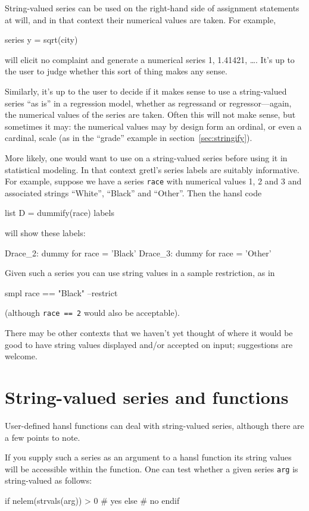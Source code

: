 String-valued series can be used on the right-hand side of assignment
statements at will, and in that context their numerical values are
taken. For example,
%
\begin{code}
series y = sqrt(city)
\end{code}
%
will elicit no complaint and generate a numerical series 1, 1.41421,
\dots{}. It's up to the user to judge whether this sort of thing
makes any sense.

Similarly, it's up to the user to decide if it makes sense to use a
string-valued series ``as is'' in a regression model, whether as
regressand or regressor---again, the numerical values of the series
are taken. Often this will not make sense, but sometimes it may: the
numerical values may by design form an ordinal, or even a cardinal,
scale (as in the ``grade'' example in section~\ref{sec:stringify}).

More likely, one would want to use  on a string-valued
series before using it in statistical modeling. In that context
gretl's series labels are suitably informative. For example, suppose
we have a series \texttt{race} with numerical values 1, 2 and 3 and
associated strings ``White'', ``Black'' and ``Other''. Then the hansl
code
\begin{code}
list D = dummify(race)
labels
\end{code}
will show these labels:
\begin{code}
Drace_2: dummy for race = 'Black'
Drace_3: dummy for race = 'Other'
\end{code}

Given such a series you can use string values in a sample restriction,
as in
\begin{code}
smpl race == "Black" --restrict
\end{code}
(although \texttt{race == 2} would also be acceptable).

There may be other contexts that we haven't yet thought of where it
would be good to have string values displayed and/or accepted on
input; suggestions are welcome.

\section{String-valued series and functions}

User-defined hansl functions can deal with string-valued series,
although there are a few points to note.

If you supply such a series as an argument to a hansl function its
string values will be accessible within the function. One can test
whether a given series \texttt{arg} is string-valued as follows:
\begin{code}
if nelem(strvals(arg)) > 0
  # yes
else
  # no
endif
\end{code}

